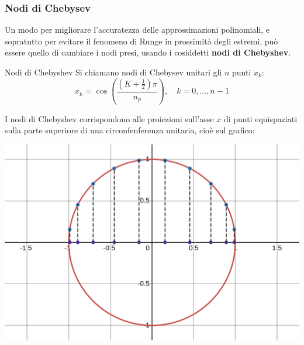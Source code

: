 \documentclass[a4paper,11pt]{article}
\begin{document}
\subsubsection{Nodi di Chebysev}
Un modo per migliorare l'accuratezza delle approssimazioni polinomiali, e sopratutto per evitare il fenomeno di Runge in prossimità degli estremi, può essere quello di cambiare i nodi presi, usando i cosiddetti \textbf{nodi di Chebyshev}.

\begin{definition}{Nodi di Chebyshev}
	Si chiamano nodi di Chebysev unitari gli $n$ punti $x_k$:
	$$
	x_k = \cos\left(\frac{\left(K+\frac{1}{2}\right)\pi}{n_{p}}\right), \quad k = 0, ..., n - 1
	$$
\end{definition}

\par\bigskip

\noindent
\begin{minipage}{\textwidth}
I nodi di Chebyshev corrispondono alle proiezioni sull'asse $x$ di punti equispaziati sulla parte superiore di una circonfenferenza unitaria, cioè sul grafico:
\begin{center}
	\includegraphics[scale=0.28]{../figures/chebyshev_nodes.png}
\end{center}
\end{minipage}

\par\bigskip
\end{document}
